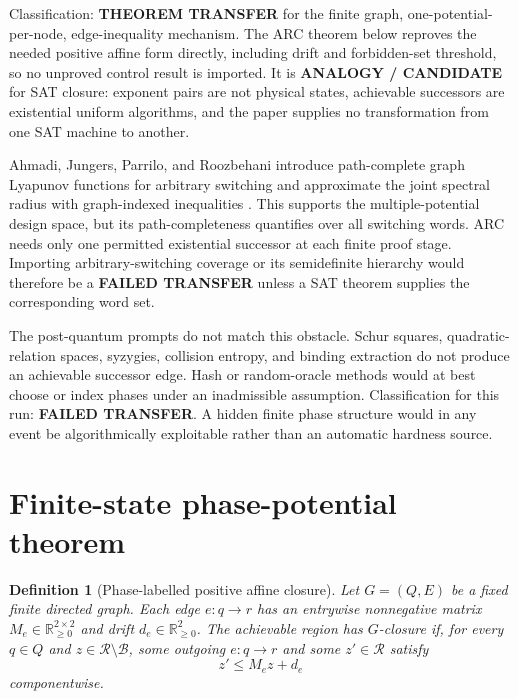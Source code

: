 \documentclass[11pt]{article}
\newtheorem{definition}[theorem]{Definition}
\newcommand{\R}{\mathcal R}
\newcommand{\B}{\mathcal B}
\begin{document}
Classification: \textbf{THEOREM TRANSFER} for the finite graph, one-potential-
per-node, edge-inequality mechanism.  The ARC theorem below reproves the
needed positive affine form directly, including drift and forbidden-set
threshold, so no unproved control result is imported.  It is
\textbf{ANALOGY / CANDIDATE} for SAT closure: exponent pairs are not physical
states, achievable successors are existential uniform algorithms, and the
paper supplies no transformation from one SAT machine to another.

Ahmadi, Jungers, Parrilo, and Roozbehani introduce path-complete graph
Lyapunov functions for arbitrary switching and approximate the joint spectral
radius with graph-indexed inequalities
\cite{arc0007AhmadiPathComplete}.  This supports the multiple-potential
design space, but its path-completeness quantifies over all switching words.
ARC needs only one permitted existential successor at each finite proof stage.
Importing arbitrary-switching coverage or its semidefinite hierarchy would
therefore be a \textbf{FAILED TRANSFER} unless a SAT theorem supplies the
corresponding word set.

The post-quantum prompts do not match this obstacle.  Schur squares,
quadratic-relation spaces, syzygies, collision entropy, and binding extraction
do not produce an achievable successor edge.  Hash or random-oracle methods
would at best choose or index phases under an inadmissible assumption.
Classification for this run: \textbf{FAILED TRANSFER}.  A hidden finite
phase structure would in any event be algorithmically exploitable rather than
an automatic hardness source.

\section{Finite-state phase-potential theorem}
\begin{definition}[Phase-labelled positive affine closure]
Let \(G=(Q,E)\) be a fixed finite directed graph.  Each edge
\(e:q\to r\) has an entrywise nonnegative matrix
\(M_e\in\mathbb R_{\ge0}^{2\times2}\) and drift
\(d_e\in\mathbb R_{\ge0}^{2}\).  The achievable region has
\(G\)-closure if, for every \(q\in Q\) and
\(z\in\R\setminus\B\), some outgoing \(e:q\to r\) and some
\(z'\in\R\) satisfy
\[
 z'\le M_ez+d_e
\]
componentwise.
\end{definition}
\end{document}
